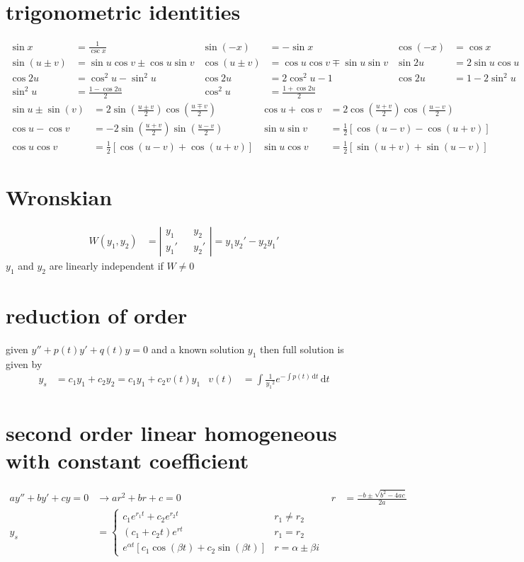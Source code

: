 \documentclass{article}
\newcommand{\abs}[1]{\left\lvert #1 \right\rvert}
\begin{document}
\section*{trigonometric identities}
\begin{align*}
	\sin x&=\frac{1}{\csc x} & \sin(-x)&=-\sin x & \cos(-x)&=\cos x\\
	\sin(u\pm v)&=\sin u \cos v \pm \cos u \sin v & \cos(u \pm v)&=\cos u \cos v \mp \sin u \sin v & \sin 2u&=2\sin u \cos u\\
	\cos 2u&=\cos^2 u - \sin^2 u & \cos 2u&=2\cos^2 u - 1 & \cos 2u&=1 - 2\sin^2 u\\
	\sin^2 u&=\frac{1-\cos 2u}{2} & \cos^2 u&=\frac{1+\cos 2u}{2}
\end{align*}
\begin{align*}
	\sin u \pm \sin(v)&=2\sin\left(\frac{u\pm v}{2}\right)\cos\left(\frac{u \mp v}{2}\right) & \cos u + \cos v&=2\cos\left(\frac{u + v}{2}\right)\cos\left(\frac{u - v}{2}\right)\\
	\cos u - \cos v&=-2\sin\left(\frac{u + v}{2}\right)\sin\left(\frac{u - v}{2}\right) & \sin u\sin v&=\frac{1}{2}[\cos(u-v)-\cos(u+v)]\\
	\cos u\cos v&=\frac{1}{2}[\cos(u-v)+\cos(u+v)] & \sin u\cos v&=\frac{1}{2}[\sin(u+v)+\sin(u-v)]
\end{align*}

\section*{Wronskian}
\begin{align*}
	W(y_1,y_2)&=\abs{
	\begin{aligned}
	y_1&&y_2\\
	y_1'&&y_2'
	\end{aligned}
	}=y_1y_2'-y_2y_1'
\end{align*}
$y_1$ and $y_2$ are linearly independent if $W\neq0$

\section*{reduction of order}
given $y''+p(t)y'+q(t)y=0$ and a known solution $y_1$ then full solution is given by
\begin{align*}
	y_s&=c_1y_1+c_2y_2=c_1y_1+c_2v(t)y_1 & v(t)&=\int{\frac{1}{{y_1}^2}e^{-\int{p(t)\,\mathrm{d}t}}\,\mathrm{d}t}
\end{align*}

\section*{second order linear homogeneous with constant coefficient}
\begin{align*}
	ay''+by'+cy=0&\rightarrow ar^2+br+c=0 &
	r&=\frac{-b\pm\sqrt{b^2-4ac}}{2a} \\
	y_s&=
	\begin{cases}
		c_1e^{r_1t}+c_2e^{r_2t} & r_1\neq r_2\\
		(c_1+c_2t)e^{rt} & r_1=r_2\\
		e^{\alpha t}\left[c_1\cos(\beta t)+c_2\sin(\beta t)\right] & r=\alpha\pm\beta i
	\end{cases}
\end{align*}
\end{document}
